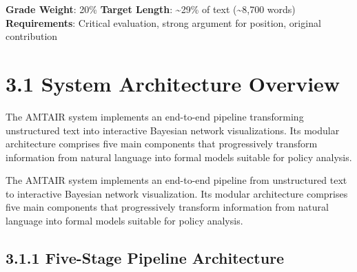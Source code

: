 \documentclass[
  11pt,
  letterpaper,
]{book}
\begin{document}

\begin{tcolorbox}[enhanced jigsaw, toprule=.15mm, colbacktitle=quarto-callout-note-color!10!white, opacitybacktitle=0.6, leftrule=.75mm, coltitle=black, rightrule=.15mm, opacityback=0, bottomtitle=1mm, title=\textcolor{quarto-callout-note-color}{\faInfo}\hspace{0.5em}{Chapter Overview}, toptitle=1mm, breakable, titlerule=0mm, left=2mm, arc=.35mm, colframe=quarto-callout-note-color-frame, bottomrule=.15mm, colback=white]

\textbf{Grade Weight}: 20\% \textbar{} \textbf{Target Length}:
\textasciitilde29\% of text (\textasciitilde8,700 words)\\
\textbf{Requirements}: Critical evaluation, strong argument for
position, original contribution

\end{tcolorbox}

\section*{3.1 System Architecture
Overview}\label{sec-system-architecture}


The AMTAIR system implements an end-to-end pipeline transforming
unstructured text into interactive Bayesian network visualizations. Its
modular architecture comprises five main components that progressively
transform information from natural language into formal models suitable
for policy analysis.

The AMTAIR system implements an end-to-end pipeline from unstructured
text to interactive Bayesian network visualization. Its modular
architecture comprises five main components that progressively transform
information from natural language into formal models suitable for policy
analysis.

\subsection*{3.1.1 Five-Stage Pipeline
Architecture}\label{sec-five-stage-pipeline}
\end{document}
